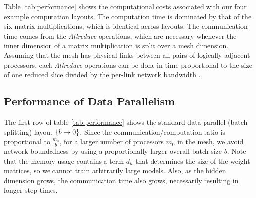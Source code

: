 \documentclass{article}
\begin{document}
\begin{itemize}
\begin{table}[h!] \label{tab:performance}
\caption{Computation, communication and memory costs for four layouts of the computation in Algorithm 1.
$\gamma$ represents the time per FLOP on one processor and $\beta$ represents the time per transmitted value on one link.  Computation costs omit lower-order terms.  Memory costs are approximate and omit constant factors.  To save space, we define $\DXY = d_x + d_y$.}
\label{tab:performance}
\end{table}

Table \ref{tab:performance} shows the computational costs associated with our four example computation layouts.  The computation time is dominated by that of the six matrix multiplications, which is identical across layouts.  The communication time comes from the \textit{Allreduce} operations, which are necessary whenever the inner dimension of a matrix multiplication is split over a mesh dimension.  Assuming that the mesh has physical links between all pairs of logically adjacent processors, each \textit{Allreduce} operations can be done in time proportional to the size of one reduced slice divided by the per-link network bandwidth \cite{Jain10y.:optimal}.

\subsection{Performance of Data Parallelism}
The first row of table \ref{tab:performance} shows the standard data-parallel (batch-splitting) layout ${{\{b \rightarrow 0\}}}$.  Since the communication/computation ratio is proportional to  $\frac{m_0}{b}$, for a larger number of processors $m_0$ in the mesh, we avoid network-boundedness by using a proportionally larger overall batch size $b$.   Note that the memory usage contains a term $d_h$ that determines the size of the weight matrices, so we cannot train arbitrarily large models.   Also, as the hidden dimension grows, the communication time also grows, necessarily resulting in longer step times.


\end{itemize}
\end{document}
